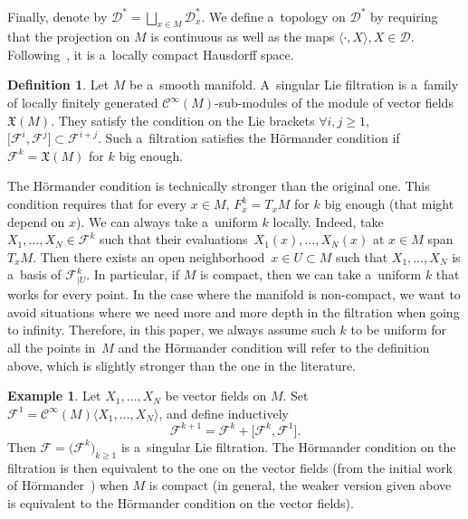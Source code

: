 \documentclass[10pt,a4paper]{article}
\newcommand{\CCC}{\mathscr{C}} %
\newcommand{\F}{\mathcal{F}} %
\newcommand{\lag}{\langle}
\newcommand{\rag}{\rangle}
\newcommand{\Fb}{\mathcal{F}} %
\numberwithin{equation}{section}
\theoremstyle{definition}
\newtheorem{mydef}[thm]{Definition}
\newtheorem{ex}[thm]{Example}
\begin{document}
Finally, denote by $\mathcal{D}^* = \bigsqcup_{x\in M}\mathcal{D}_x^*$. We define a~topology on $\mathcal{D}^*$ by requiring that the projection on $M$ is continuous as well as the maps $\lag \cdot, X \rag, X\in \mathcal{D}$. Following~\cite[Proposition~2.10]{AndroulidakisSkandalisPseudoDiff}, it is a~locally compact Hausdorff space.

\begin{mydef}
 Let $M$ be a~smooth manifold. A~singular Lie filtration is a~family \smash{$\Fb = \bigl(\F^j\bigr){}_{j\geq 1}$} of locally finitely generated $\CCC^{\infty}(M)$-sub-modules of the module of vector fields $\mathfrak{X}(M)$. They satisfy the condition on the Lie brackets $\forall i,j\geq 1$, $\big[\F^i,\F^j\big] \subset \F^{i+j}$.
 Such a~filtration satisfies the H\"ormander condition if $\F^k = \mathfrak{X}(M)$ for $k$ big enough.
\end{mydef}

The H\"ormander condition is technically stronger than the original one. This condition requires that for every $x\in M$, $F^k_x = T_xM$ for $k$ big enough (that might depend on $x$). We can always take a~uniform $k$ locally. Indeed, take $X_1,\dots,X_N \in \F^k$ such that their evaluations~${X_1(x),\dots,X_N(x)}$ at $x\in M$ span $T_xM$. Then there exists an open neighborhood~${x\in U\subset M}$ such that $X_1, \dots, X_N$ is a~basis of $\F^k_{|U}$. In particular, if $M$ is compact, then we can take a~uniform $k$ that works for every point. In the case where the manifold is non-compact, we want to avoid situations where we need more and more depth in the filtration when going to infinity. Therefore, in this paper, we always assume such $k$ to be uniform for all the points in~$M$ and the H\"ormander condition will refer to the definition above, which is slightly stronger than the one in the literature.

\begin{ex}
 Let $X_1, \dots, X_N$ be vector fields on $M$. Set $\F^1 = \CCC^{\infty}(M)\lag X_1,\dots,X_N\rag$, and define inductively
 \[\F^{k+1} = \F^k + \big[\F^k,\F^1\big].\] Then $\F = \bigl(\F^k\bigr)_{k\geq 1}$ is a~singular Lie filtration. The H\"ormander condition on the filtration is then equivalent to the one on the vector fields (from the initial work of H\"ormander~\cite{Hormander}) when $M$ is compact (in general, the weaker version given above is equivalent to the H\"ormander condition on the vector fields).
\end{ex}
\end{document}
